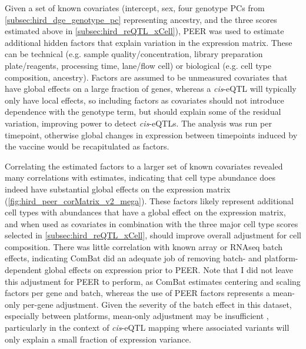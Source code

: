Given a set of known covariates (intercept, sex, four genotype \glspl{PC} from \cref{subsec:hird_dge_genotype_pc} representing ancestry, and the three  scores estimated above in \cref{subsec:hird_reQTL_xCell}),
PEER was used to estimate additional hidden factors that explain variation in the expression matrix.
These can be technical (e.g. sample quality/concentration, library preparation plate/reagents, processing time, lane/flow cell) or biological (e.g. cell type composition, ancestry).
Factors are assumed to be unmeasured covariates that have global effects on a large fraction of genes, 
whereas a \textit{cis}-\gls{eQTL} will typically only have local effects, so including factors as covariates should not introduce dependence with the genotype term,
but should explain some of the residual variation, improving power to detect \textit{cis}-\glspl{eQTL}.
The analysis was run per timepoint, otherwise global changes in expression between timepoints induced by the vaccine would be recapitulated as factors.

Correlating the estimated factors to a larger set of known covariates revealed many correlations with  estimates, indicating that cell type abundance does indeed have substantial global effects on the expression matrix  (\cref{fig:hird_peer_corMatrix_v2_mega}).
These factors likely represent additional cell types with abundances that have a global effect on the expression matrix,
and when used as covariates in combination with the three major cell type scores selected in \cref{subsec:hird_reQTL_xCell}, should improve overall adjustment for cell composition.
There was little correlation with known array or \gls{RNAseq} batch effects, indicating ComBat did an adequate job of removing batch- and platform-dependent global effects on expression prior to PEER.
Note that I did not leave this adjustment for PEER to perform, as ComBat estimates centering and scaling factors per gene and batch, whereas the use of PEER factors represents a mean-only per-gene adjustment.
Given the severity of the batch effect in this dataset, especially between platforms, mean-only adjustment may be insufficient \autocite{zhang2018AlternativeEmpiricalBayes},
particularly in the context of \textit{cis}-\gls{eQTL} mapping where associated variants will only explain a small fraction of expression variance.

